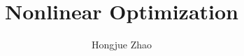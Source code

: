 \documentclass{article}
\title{Nonlinear Optimization}
\author{Hongjue Zhao}
\date{}
\begin{document}
    \maketitle
    {
         \newpage
        
    }
\end{document}
